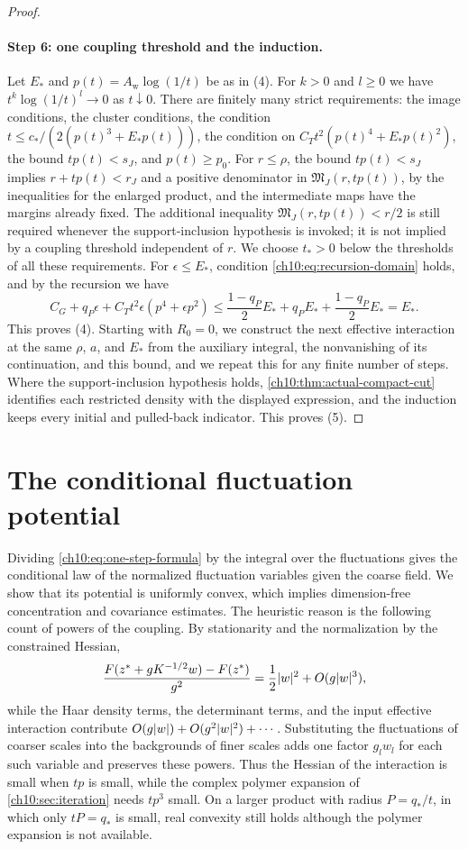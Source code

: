 \begin{proof}
\paragraph{Step 6: one coupling threshold and the induction.}
Let $E_*$ and $p(t)=A_{\mathrm w}\log(1/t)$ be as in (4). For $k>0$ and $l\ge0$ we have $t^k\log(1/t)^l\to0$ as $t\downarrow0$. There are finitely many strict requirements: the image conditions, the cluster conditions, the condition $t\le c_*/(2(p(t)^3+E_*p(t)))$, the condition on $C_Tt^2(p(t)^4+E_*p(t)^2)$, the bound $tp(t)<s_J$, and $p(t)\ge p_0$. For $r\le\rho$, the bound $tp(t)<s_J$ implies $r+tp(t)<r_J$ and a positive denominator in $\mathfrak M_J(r,tp(t))$, by the inequalities for the enlarged product, and the intermediate maps have the margins already fixed. The additional inequality $\mathfrak M_J(r,tp(t))<r/2$ is still required whenever the support-inclusion hypothesis is invoked; it is not implied by a coupling threshold independent of $r$. We choose $t_*>0$ below the thresholds of all these requirements. For $\epsilon\le E_*$, condition \eqref{ch10:eq:recursion-domain} holds, and by the recursion we have
\[
 C_G+q_P\epsilon+C_Tt^2\epsilon(p^4+\epsilon p^2)\le\frac{1-q_P}2E_*+q_PE_*+\frac{1-q_P}2E_*=E_*.
\]
This proves (4). Starting with $R_0=0$, we construct the next effective interaction at the same $\rho$, $a$, and $E_*$ from the auxiliary integral, the nonvanishing of its continuation, and this bound, and we repeat this for any finite number of steps. Where the support-inclusion hypothesis holds, \cref{ch10:thm:actual-compact-cut} identifies each restricted density with the displayed expression, and the induction keeps every initial and pulled-back indicator.   This proves (5).
\end{proof}

\section{The conditional fluctuation potential}\label{ch10:sec:potential}

Dividing \eqref{ch10:eq:one-step-formula} by the integral over the fluctuations gives the conditional law of the normalized fluctuation variables given the coarse field. We show that its potential is uniformly convex, which implies dimension-free concentration and covariance estimates. The heuristic reason is the following count of powers of the coupling. By stationarity and the normalization by the constrained Hessian,
\[
 \frac{F(z^*+gK^{-1/2}w)-F(z^*)}{g^2}=\frac12\lvert w\rvert^2+O(g\lvert w\rvert^3),
\]
while the Haar density terms, the determinant terms, and the input effective interaction contribute $O(g\lvert w\rvert)+O(g^2\lvert w\rvert^2)+\cdots$. Substituting the fluctuations of coarser scales into the backgrounds of finer scales adds one factor $g_l w_l$ for each such variable and preserves these powers. Thus the Hessian of the interaction is small when $tp$ is small, while the complex polymer expansion of \cref{ch10:sec:iteration} needs $tp^3$ small. On a larger product with radius $P=q_*/t$, in which only $tP=q_*$ is small, real convexity still holds although the polymer expansion is not available.

